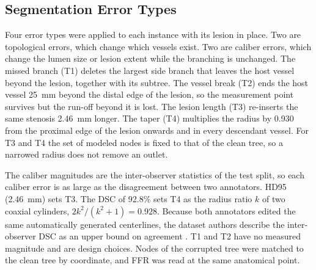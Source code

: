 \documentclass[journal,twoside,web]{ieeecolor}
\begin{document}
\subsection{Segmentation Error Types}
Four error types were applied to each instance with its lesion in place. Two are
topological errors, which change which vessels exist. Two are caliber errors, which change the lumen size or lesion
extent while the branching is unchanged. The missed branch (T1) deletes the largest side branch that leaves the host
vessel beyond the lesion, together with its subtree. The vessel break (T2) ends the host vessel 25~mm beyond the
distal edge of the lesion, so the measurement point survives but the run-off beyond it is lost. The lesion length
(T3) re-inserts the same stenosis 2.46~mm longer. The taper (T4) multiplies the radius by 0.930 from the proximal
edge of the lesion onwards and in every descendant vessel. For T3 and T4 the set of modeled nodes is fixed to that
of the clean tree, so a narrowed radius does not remove an outlet.

The caliber magnitudes are the inter-observer statistics of the test split, so each caliber error is as large as
the disagreement between two annotators. HD95 (2.46~mm) sets T3. The DSC of 92.8\% sets T4 as the radius
ratio $k$ of two coaxial cylinders, $2k^2/(k^2+1) = 0.928$. Because both annotators edited the same automatically
generated centerlines, the dataset authors describe the inter-observer DSC as an upper bound on agreement \cite{bransby2026}. T1 and T2 have
no measured magnitude and are design choices. Nodes of the corrupted tree were matched to the clean tree by
coordinate, and FFR was read at the same anatomical point.
\end{document}
